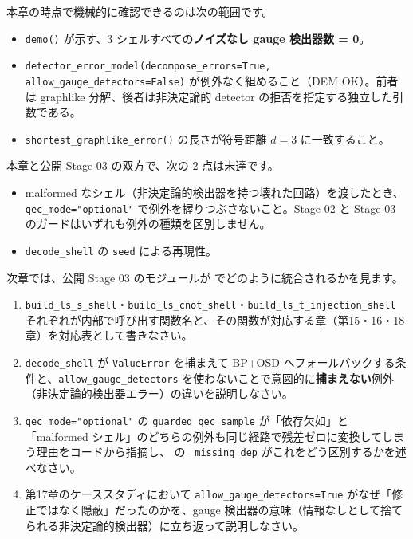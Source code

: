 本章の時点で機械的に確認できるのは次の範囲です。

\begin{itemize}
  \item \texttt{demo()} が示す、3 シェルすべての\textbf{ノイズなし gauge 検出器数 = 0}。
  \item \texttt{detector\_error\_model(decompose\_errors=True, allow\_gauge\_detectors=False)} が例外なく組めること（DEM OK）。前者は graphlike 分解、後者は非決定論的 detector の拒否を指定する独立した引数である。
  \item \texttt{shortest\_graphlike\_error()} の長さが符号距離 $d=3$ に一致すること。
\end{itemize}

本章と公開 Stage 03 の双方で、次の 2 点は未達です。

\begin{itemize}
  \item malformed なシェル（非決定論的検出器を持つ壊れた回路）を渡したとき、\texttt{qec\_mode="optional"} で例外を握りつぶさないこと。Stage 02 と Stage 03 のガードはいずれも例外の種類を区別しません。
  \item \texttt{decode\_shell} の \texttt{seed} による再現性。
\end{itemize}

次章では、公開 Stage 03 のモジュールが  でどのように統合されるかを見ます。

\begin{exercise}
  \begin{enumerate}
    \item \texttt{build\_ls\_s\_shell}・\texttt{build\_ls\_cnot\_shell}・\texttt{build\_ls\_t\_injection\_shell} それぞれが内部で呼び出す関数名と、その関数が対応する章（第15・16・18章）を対応表として書きなさい。
    \item \texttt{decode\_shell} が \texttt{ValueError} を捕まえて BP+OSD へフォールバックする条件と、\texttt{allow\_gauge\_detectors} を使わないことで意図的に\textbf{捕まえない}例外（非決定論的検出器エラー）の違いを説明しなさい。
    \item \texttt{qec\_mode="optional"} の \texttt{guarded\_qec\_sample} が「依存欠如」と「malformed シェル」のどちらの例外も同じ経路で残差ゼロに変換してしまう理由をコードから指摘し、 の \texttt{\_missing\_dep} がこれをどう区別するかを述べなさい。
    \item 第17章のケーススタディにおいて \texttt{allow\_gauge\_detectors=True} がなぜ「修正ではなく隠蔽」だったのかを、gauge 検出器の意味（情報なしとして捨てられる非決定論的検出器）に立ち返って説明しなさい。
  \end{enumerate}
\end{exercise}
